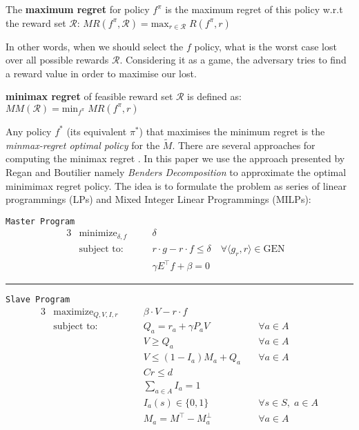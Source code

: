 \documentclass[runningheads,a4paper]{llncs}
\begin{document}
\begin{definition}
The \textbf{maximum regret} for policy $f^{\pi}$ is the maximum regret of this policy w.r.t the reward set $\mathcal{R}$: $MR(f^{\pi}, \mathcal{R}) = \text{max}_{r \in \mathcal{R}}\;R(f^{\pi},r)$ 
\end{definition}

In other words, when we should select the $f$ policy, what is the worst case lost over all possible rewards $\mathcal{R}$. Considering it as a game, the adversary tries to find a reward value in order to maximise our lost.  

\begin{definition}
\textbf{minimax regret} of feasible reward set $\mathcal{R}$ is defined as:\\ $MM(\mathcal{R}) = \text{min}_{f^{\pi}}\; MR(f^{\pi}, r)$
\end{definition}

Any policy $f^*$ (its equivalent $\pi^*$) that maximises the minimum regret is the \textit{minmax-regret optimal policy} for the $\tilde{M}$. There are several approaches for computing the minimax regret \cite{alizadeh2015,benavent2018,Regan2009,daSilva2011,Xu2009}. In this paper we use the approach presented by Regan and Boutilier \citep{Regan2009} namely \textit{Benders Decomposition} \cite{Benders1962} to approximate the optimal minimimax regret policy. The idea is to formulate the problem as series of linear programmings (LPs) and Mixed Integer Linear Programmings (MILPs):


\begin{center}\label{minimax}
\texttt{Master Program}
\begin{alignat}{3}
&\text{minimize}_{\delta, f} && \delta & \\
&\text{subject to:} &\quad& r\cdot g - r \cdot f \leq \delta \quad \forall \langle g_r, r \rangle \in \text{GEN}\\
&& \quad& \gamma E^{\top} f + \beta = 0 
\end{alignat}
\begin{center}
\noindent\rule{8cm}{0.4pt}
\end{center} 
\texttt{Slave Program}
\begin{alignat}{3}
&\text{maximize}_{Q, V, I, r} && \beta \cdot V - r \cdot f \\
&\text{subject to:} &\quad& Q_a = r_a + \gamma P_aV &\quad \forall a \in A\\
&& \quad& V \geq Q_a  &\quad \forall a \in A\\
&& \quad& V \leq (1-I_a)M_a + Q_a  &\quad \forall a \in A\\
&& \quad& Cr \leq d \\
&& \quad& \sum_{a \in A} I_a = 1  \\
&& \quad& I_a(s) \in \{0, 1 \} &\quad \forall s \in S, \; a \in A\\
&& \quad& M_a = M^{\top} - M_a^{\perp} &\quad \forall a \in A \\
\end{alignat}
\end{center}
\end{document}
